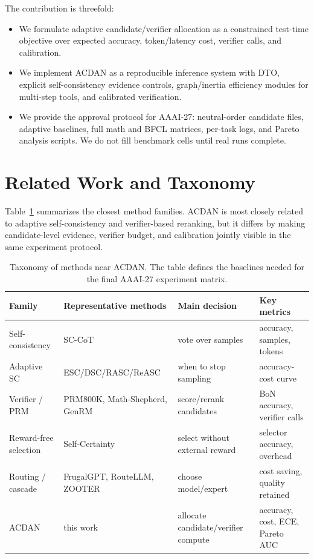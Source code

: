 \documentclass[letterpaper]{article} %
\begin{document}
The contribution is threefold:
\begin{itemize}
\item We formulate adaptive candidate/verifier allocation as a constrained
test-time objective over expected accuracy, token/latency cost, verifier calls,
and calibration.
\item We implement ACDAN as a reproducible inference system with DTO, explicit
self-consistency evidence controls, graph/inertia efficiency modules for
multi-step tools, and calibrated verification.
\item We provide the approval protocol for AAAI-27: neutral-order candidate
files, adaptive baselines, full math and BFCL matrices, per-task logs, and
Pareto analysis scripts. We do not fill benchmark cells until real runs complete.
\end{itemize}

\section{Related Work and Taxonomy}
Table~\ref{tab:taxonomy} summarizes the closest method families. ACDAN is most
closely related to adaptive self-consistency and verifier-based reranking, but
it differs by making candidate-level evidence, verifier budget, and calibration
jointly visible in the same experiment protocol.

\begin{table}[t]
\centering
\caption{Taxonomy of methods near ACDAN. The table defines the baselines needed
for the final AAAI-27 experiment matrix.}
\label{tab:taxonomy}
\begin{tabular}{@{}llll@{}}
\toprule
Family & Representative methods & Main decision & Key metrics \\
\midrule
Self-consistency & SC-CoT~\citep{wang2022selfconsistency} & vote over samples & accuracy, samples, tokens \\
Adaptive SC & ESC/DSC/RASC/ReASC~\citep{li2024esc,wang2024dsc,wan2025rasc,kim2026reasc} & when to stop sampling & accuracy-cost curve \\
Verifier / PRM & PRM800K, Math-Shepherd, GenRM~\citep{lightman2023verify,wang2023mathshepherd,zhang2024genrm} & score/rerank candidates & BoN accuracy, verifier calls \\
Reward-free selection & Self-Certainty~\citep{kang2025selfcertainty} & select without external reward & selector accuracy, overhead \\
Routing / cascade & FrugalGPT, RouteLLM, ZOOTER~\citep{chen2023frugalgpt,ong2024routellm,lu2024zooter} & choose model/expert & cost saving, quality retained \\
ACDAN & this work & allocate candidate/verifier compute & accuracy, cost, ECE, Pareto AUC \\
\bottomrule
\end{tabular}
\end{table}
\end{document}
